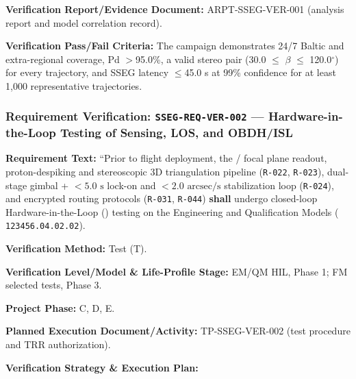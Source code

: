 \par\textbf{Verification Report/Evidence Document:} ARPT-SSEG-VER-001 (analysis report and model correlation record).
\par\textbf{Verification Pass/Fail Criteria:} The campaign demonstrates 24/7 Baltic and extra-regional coverage, Pd $>$95.0\%, a valid stereo pair (30.0 $\le$ $\beta$ $\le$ 120.0$^\circ$) for every trajectory, and SSEG latency $\le$45.0 s at 99\% confidence for at least 1,000 representative trajectories.
\par\medskip
\subsubsection{Requirement Verification: \texttt{SSEG-REQ-VER-002} --- Hardware-in-the-Loop Testing of Sensing, LOS, and OBDH/ISL}
\label{ver:SSEG-REQ-VER-002}
\textbf{Requirement Text:} ``Prior to flight deployment, the / focal plane readout,  proton-despiking and stereoscopic 3D triangulation pipeline (\texttt{R-022}, \texttt{R-023}), dual-stage gimbal +  $< 5.0\text{ s}$ lock-on and $< 2.0\text{ arcsec/s}$ stabilization loop (\texttt{R-024}), and encrypted  routing protocols (\texttt{R-031}, \texttt{R-044}) \textbf{shall} undergo closed-loop Hardware-in-the-Loop () testing on the Engineering and Qualification Models ( \texttt{123456.04.02.02}).
\par\textbf{Verification Method:} Test (T).
\par\textbf{Verification Level/Model \& Life-Profile Stage:} EM/QM HIL, Phase 1; FM selected tests, Phase 3.
\par\textbf{Project Phase:} C, D, E.
\par\textbf{Planned Execution Document/Activity:} TP-SSEG-VER-002 (test procedure and TRR authorization).
\par\textbf{Verification Strategy \& Execution Plan:}
